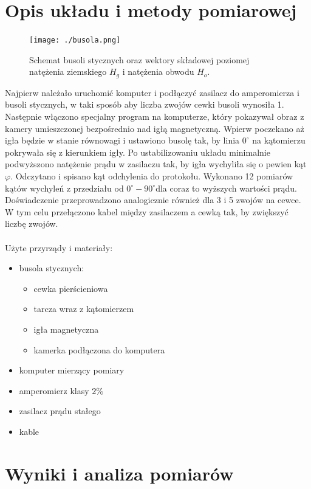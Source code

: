 \documentclass[a4paper,10pt]{article}
\begin{document}
\section{Opis układu i metody pomiarowej}
\begin{figure}[H]
\centering
  \texttt{[image: ./busola.png]}
  \caption{Schemat busoli stycznych oraz wektory składowej poziomej natężenia ziemskiego $H_g$ i natężenia obwodu $H_o$.}
  \label{}
\end{figure}
Najpierw należało uruchomić komputer i podłączyć zasilacz do amperomierza i busoli stycznych, w taki sposób aby liczba zwojów cewki busoli wynosiła 1. Następnie włączono specjalny program na komputerze, który pokazywał obraz z kamery umieszczonej bezpośrednio nad igłą magnetyczną. Wpierw poczekano aż igła będzie w stanie równowagi i ustawiono busolę tak, by linia $0^\circ$ na kątomierzu pokrywała się z kierunkiem igły. Po ustabilizowaniu układu minimalnie podwyższono natężenie prądu w zasilaczu tak, by igła wychyliła się o pewien kąt $\varphi$. Odczytano i spisano kąt odchylenia do protokołu. Wykonano 12 pomiarów kątów wychyleń z przedziału od $0^\circ - 90^\circ$dla coraz to wyższych wartości prądu. Doświadczenie przeprowadzono analogicznie również dla 3 i 5 zwojów na cewce. W tym celu przełączono kabel między zasilaczem a cewką tak, by zwiększyć liczbę zwojów. 
\\
\\Użyte przyrządy i materiały:
\begin{itemize}
  \item busola stycznych:
    \begin{itemize}
      \item cewka pierścieniowa
      \item tarcza wraz z kątomierzem
      \item igła magnetyczna
      \item kamerka podłączona do komputera
    \end{itemize}
  \item komputer mierzący pomiary
  \item amperomierz klasy $2\%$
  \item zasilacz prądu stałego
  \item kable
\end{itemize}
\section{Wyniki i analiza pomiarów}
\end{document}
